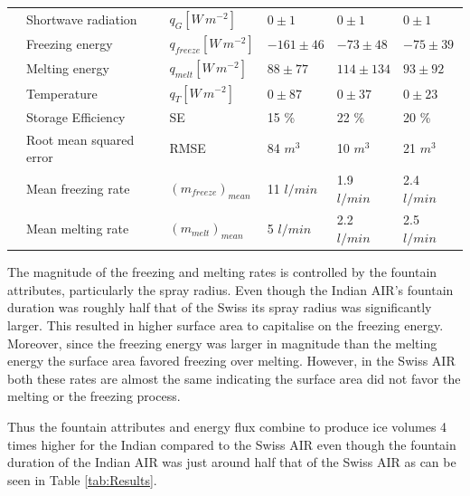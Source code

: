 \documentclass[utf8]{frontiersSCNS} %
\begin{document}
\begin{table}
\begin{tabular}{@{}|llllll|@{}}
		\multicolumn{1}{|l|}{} & Shortwave radiation     & $q_{G} [W\,m^{-2}]  $     & $0 \pm 1$     & $0 \pm 1$     & $0 \pm 1$     \\
		\multicolumn{1}{|l|}{} & Freezing energy         & $q_{freeze} [W\,m^{-2}] $ & $-161\pm 46$  & $-73 \pm 48$  & $-75\pm 39$   \\
		\multicolumn{1}{|l|}{} & Melting energy          & $q_{melt} [W\,m^{-2}] $   & $88 \pm 77$   & $114\pm 134$  & $93 \pm 92$   \\
		\multicolumn{1}{|l|}{} & Temperature             & $q_{T} [W\,m^{-2}] $      & $0 \pm 87$    & $0 \pm 37$    & $0 \pm 23$    \\\midrule
		\multicolumn{1}{|l|}{\multirow{3}{*}{\rotatebox[origin=c]{90}{Charecteristics}}}
		                       & Storage Efficiency      & SE                        & 15 \%         & 22 \%         & 20 \%         \\
		\multicolumn{1}{|l|}{} & Root mean squared error & RMSE                      & 84 $m^{3}$    & 10 $m^{3}$    & 21 $m^{3}$    \\
		\multicolumn{1}{|l|}{} & Mean freezing rate      & $(m_{freeze})_{mean}$     & 11 $l/min$    & 1.9 $l/min$   & 2.4 $l/min$   \\
		\multicolumn{1}{|l|}{} & Mean melting rate       & $(m_{melt})_{mean}$       & 5 $l/min$     & 2.2 $l/min$   & 2.5 $l/min$   \\\bottomrule
	\end{tabular}
\end{table}

The magnitude of the freezing and melting rates is controlled by the fountain attributes, particularly the spray radius.
Even though the Indian AIR's fountain duration was roughly half that of the Swiss its spray radius was significantly
larger. This resulted in higher surface area to capitalise on the freezing energy. Moreover, since the freezing energy
was larger in magnitude than the melting energy the surface area favored freezing over melting. However, in the Swiss
AIR both these rates are almost the same indicating the surface area did not favor the melting or the freezing process.

Thus the fountain attributes and energy flux combine to produce ice volumes 4 times higher for the Indian compared to
the Swiss AIR even though the fountain duration of the Indian AIR was just around half that of the Swiss AIR as can be
seen in Table \ref{tab:Results}.

\end{document}
